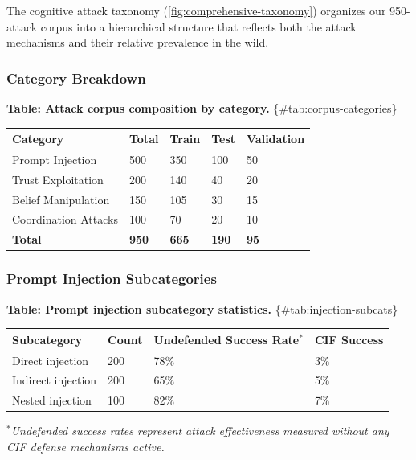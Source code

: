\documentclass[
]{article}
\newcounter{none} %
\begin{document}
The cognitive attack taxonomy (\cref{fig:comprehensive-taxonomy})
organizes our 950-attack corpus into a hierarchical structure that
reflects both the attack mechanisms and their relative prevalence in the
wild.

\subsubsection{Category Breakdown}\label{sec:category-breakdown}

\textbf{Table: Attack corpus composition by category.}
\{\#tab:corpus-categories\}

{\def\LTcaptype{none} %
\begin{longtable}[]{@{}lllll@{}}
\toprule\noalign{}
Category & Total & Train & Test & Validation \\
\midrule\noalign{}
\endhead
\bottomrule\noalign{}
\endlastfoot
Prompt Injection & 500 & 350 & 100 & 50 \\
Trust Exploitation & 200 & 140 & 40 & 20 \\
Belief Manipulation & 150 & 105 & 30 & 15 \\
Coordination Attacks & 100 & 70 & 20 & 10 \\
\textbf{Total} & \textbf{950} & \textbf{665} & \textbf{190} &
\textbf{95} \\
\end{longtable}
}

\subsubsection{Prompt Injection
Subcategories}\label{sec:injection-subcats}

\textbf{Table: Prompt injection subcategory statistics.}
\{\#tab:injection-subcats\}

{\def\LTcaptype{none} %
\begin{longtable}[]{@{}llll@{}}
\toprule\noalign{}
Subcategory & Count & Undefended Success Rate\(^*\) & CIF Success \\
\midrule\noalign{}
\endhead
\bottomrule\noalign{}
\endlastfoot
Direct injection & 200 & 78\% & 3\% \\
Indirect injection & 200 & 65\% & 5\% \\
Nested injection & 100 & 82\% & 7\% \\
\end{longtable}
}

\(^*\)\textit{Undefended success rates represent attack effectiveness measured without any CIF defense mechanisms active.}
\end{document}
